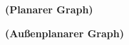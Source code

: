 \begin{defi}{\textbf{(Planarer Graph)}}\\
\end{defi}


\begin{defi}{\textbf{(Außenplanarer Graph)}}\\
\end{defi}

